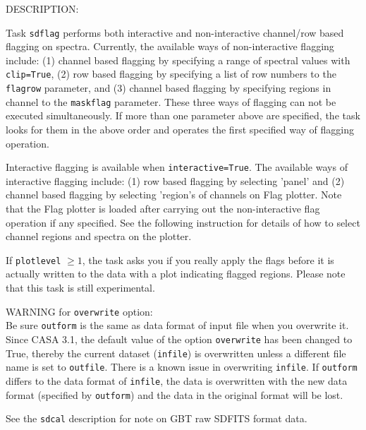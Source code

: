 DESCRIPTION:

Task {\tt sdflag} performs both interactive and non-interactive channel/row 
based flagging on spectra.
Currently, the available ways of non-interactive flagging include: 
(1) channel based flagging by specifying a range of spectral values 
with {\tt clip=True}, (2) row based flagging by specifying a list of row 
numbers to the {\tt flagrow} parameter, and (3) channel based flagging by 
specifying regions in channel to the {\tt maskflag} parameter. 
These three ways of flagging can not be executed simultaneously. 
If more than one parameter above are specified, the task looks for 
them in the above order and operates the first specified way of 
flagging operation.

Interactive flagging is available when {\tt interactive=True}. 
The available ways of interactive flagging include: 
(1) row based flagging by selecting 'panel' and (2) channel
based flagging by selecting 'region's of channels on Flag plotter. 
Note that the Flag plotter is loaded after carrying out the 
non-interactive flag operation if any specified. See the following instruction for
details of how to select channel regions and spectra on the plotter.

If {\tt plotlevel} $ \ge 1 $, the task asks you if you really apply the 
flags before it is actually written to the data with a plot 
indicating flagged regions.
Please note that this task is still experimental.

WARNING for {\tt overwrite} option:\\
Be sure {\tt outform} is the same as data format of input file when you
overwrite it. Since CASA 3.1, the default value of the option {\tt overwrite}
has been changed to True, thereby the current dataset ({\tt infile}) is 
overwritten unless a different file name is set to {\tt outfile}. 
There is a known issue in overwriting {\tt infile}. If {\tt outform} differs to the
data format of {\tt infile}, the data is overwritten with the new data format 
(specified by {\tt outform}) and the data in the original format will be lost.

See the {\tt sdcal} description for note on GBT raw SDFITS format data.



